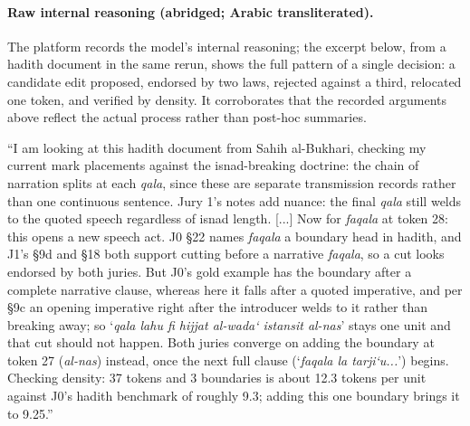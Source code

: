 \documentclass[11pt]{article}
\begin{document}
\paragraph{Raw internal reasoning (abridged; Arabic transliterated).} The platform
records the model's internal reasoning; the excerpt below, from a hadith document in the
same rerun, shows the full pattern of a single decision: a candidate edit proposed,
endorsed by two laws, rejected against a third, relocated one token, and verified by
density. It corroborates that the recorded arguments above reflect the actual process
rather than post-hoc summaries.
\begin{tcolorbox}[colback=white, boxrule=0.4pt, left=3pt, right=3pt, top=3pt, bottom=3pt]
\scriptsize
``I am looking at this hadith document from Sahih al-Bukhari, checking my current mark
placements against the isnad-breaking doctrine: the chain of narration splits at each
\textit{qala}, since these are separate transmission records rather than one continuous
sentence. Jury 1's notes add nuance: the final \textit{qala} still welds to the quoted
speech regardless of isnad length. [...] Now for \textit{faqala} at token 28: this opens
a new speech act. J0 \S22 names \textit{faqala} a boundary head in hadith, and J1's
\S9d and \S18 both support cutting before a narrative \textit{faqala}, so a cut looks
endorsed by both juries. But J0's gold example has the boundary after a complete
narrative clause, whereas here it falls after a quoted imperative, and per \S9c an
opening imperative right after the introducer welds to it rather than breaking away; so
`\textit{qala lahu fi hijjat al-wada` istansit al-nas}' stays one unit and that cut
should not happen. Both juries converge on adding the boundary at token 27
(\textit{al-nas}) instead, once the next full clause (`\textit{faqala la tarji`u...}')
begins. Checking density: 37 tokens and 3 boundaries is about 12.3 tokens per unit
against J0's hadith benchmark of roughly 9.3; adding this one boundary brings it to
9.25.''
\end{tcolorbox}
\end{document}
